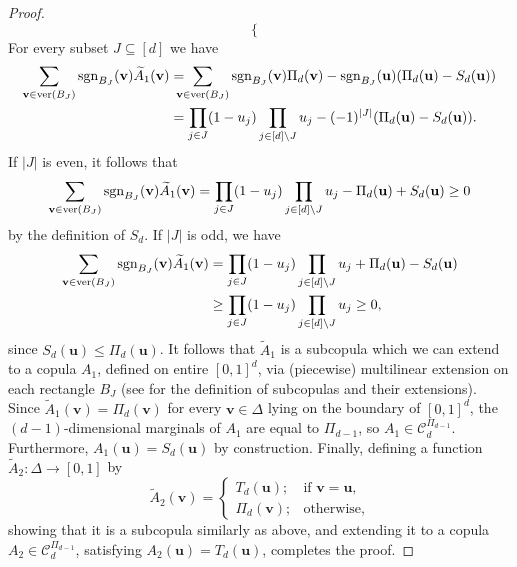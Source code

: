 \documentclass[12pt,a4paper]{amsart}
\theoremstyle{definition}
\newcommand{\kc}{\mathcal{C}}
\begin{document}
\begin{proof}
$$\begin{cases}
\end{cases}$$
For every subset $J \subseteq [d]$ we have
\begin{align*}
\sum_{\mathbf{v} \in \textup{ver}(B_J)} \textup{sgn}_{B_J}(\mathbf{v})\widetilde{A}_1(\mathbf{v}) 
     &= \hspace{-3mm} \sum_{\mathbf{v} \in \textup{ver}(B_J)} \textup{sgn}_{B_J}(\mathbf{v})\Pi_d(\mathbf{v}) - \textup{sgn}_{B_J}(\mathbf{u})(\Pi_d(\mathbf{u}) - S_d(\mathbf{u})) \\
     &= \prod_{j \in J} (1-u_j) \prod_{j \in [d] \setminus J} u_j - (-1)^{|J|}(\Pi_d(\mathbf{u}) - S_d(\mathbf{u})).
\end{align*}
If $|J|$ is even, it follows that
$$\sum_{\mathbf{v} \in \textup{ver}(B_J)} \textup{sgn}_{B_J}(\mathbf{v})\widetilde{A}_1(\mathbf{v}) 
= \prod_{j \in J} (1-u_j) \prod_{j \in [d] \setminus J} u_j - \Pi_d(\mathbf{u}) + S_d(\mathbf{u}) \ge 0$$
by the definition of $S_d$. If  $|J|$ is odd, we have 
\begin{align*}
\sum_{\mathbf{v} \in \textup{ver}(B_J)} \textup{sgn}_{B_J}(\mathbf{v})\widetilde{A}_1(\mathbf{v}) 
&= \prod_{j \in J} (1-u_j) \prod_{j \in [d] \setminus J} u_j + \Pi_d(\mathbf{u}) - S_d(\mathbf{u}) \\
&\ge \prod_{j \in J} (1-u_j) \prod_{j \in [d] \setminus J} u_j \ge 0,    
\end{align*}
since $S_d(\mathbf{u}) \le \Pi_d(\mathbf{u})$. It follows that $\widetilde{A}_1$ is a subcopula which we can extend to a copula $A_1$, defined on entire $[0,1]^d$, via (piecewise) multilinear extension on each rectangle $B_J$ (see \cite{Nels} for the definition of subcopulas and their extensions). Since $\widetilde{A}_1(\mathbf{v}) = \Pi_d(\mathbf{v})$ for every $\mathbf{v} \in \Delta$ lying on the boundary of $[0,1]^d$, the $(d-1)$-dimensional marginals of $A_1$ are equal to $\Pi_{d-1}$, so $A_1 \in \kc_d^{\Pi_{d-1}}$. Furthermore, $A_1(\mathbf{u}) = S_d(\mathbf{u})$ by construction. Finally, defining a function $\widetilde{A}_2 \colon \Delta \to [0,1]$ by 
$$\widetilde{A}_2(\mathbf{v}) = \begin{cases} T_d(\mathbf{u}); & \text{if } \mathbf{v} = \mathbf{u}, \\
\Pi_d(\mathbf{v}); & \text{otherwise,} 
\end{cases}$$
showing that it is a subcopula similarly as above, and extending it to a copula $A_2 \in \kc_d^{\Pi_{d-1}}$, satisfying $A_2(\mathbf{u}) = T_d(\mathbf{u})$, completes the proof.
\end{proof}
\end{document}
